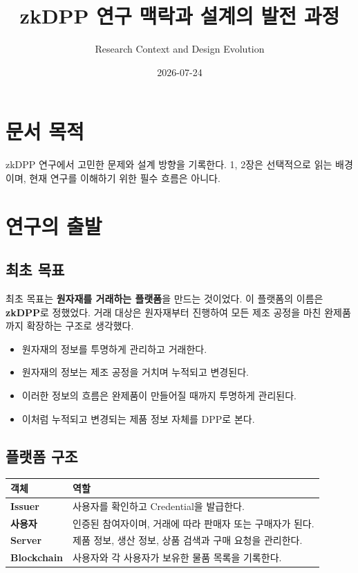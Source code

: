 \documentclass[11pt,a4paper]{extarticle}
\title{zkDPP 연구 맥락과 설계의 발전 과정}
\author{Research Context and Design Evolution}
\date{2026-07-24}
\begin{document}
\maketitle

\section*{문서 목적}

zkDPP 연구에서 고민한 문제와 설계 방향을 기록한다. 1, 2장은 선택적으로
읽는 배경이며, 현재 연구를 이해하기 위한 필수 흐름은 아니다.

\tableofcontents
\newpage

\section{연구의 출발}

\subsection{최초 목표}

최초 목표는 \textbf{원자재를 거래하는 플랫폼}을 만드는 것이었다. 이 플랫폼의
이름은 \textbf{zkDPP}로 정했었다. 거래 대상은 원자재부터 진행하여
모든 제조 공정을 마친 완제품까지 확장하는 구조로 생각했다.

\begin{itemize}
  \item 원자재의 정보를 투명하게 관리하고 거래한다.
  \item 원자재의 정보는 제조 공정을 거치며 누적되고 변경된다.
  \item 이러한 정보의 흐름은 완제품이 만들어질 때까지 투명하게 관리된다.
  \item 이처럼 누적되고 변경되는 제품 정보 자체를 DPP로 본다.
\end{itemize}

\subsection{플랫폼 구조}

\begin{center}
  \renewcommand{\arraystretch}{1.25}
  \begin{tabularx}{\textwidth}{@{}lX@{}}
    \toprule
    \textbf{객체}         & \textbf{역할}                       \\
    \midrule
    \textbf{Issuer}     & 사용자를 확인하고 Credential을 발급한다.       \\
    \textbf{사용자}        & 인증된 참여자이며, 거래에 따라 판매자 또는 구매자가 된다. \\
    \textbf{Server}     & 제품 정보, 생산 정보, 상품 검색과 구매 요청을 관리한다. \\
    \textbf{Blockchain} & 사용자와 각 사용자가 보유한 물품 목록을 기록한다.      \\
    \bottomrule
  \end{tabularx}
\end{center}
\end{document}
